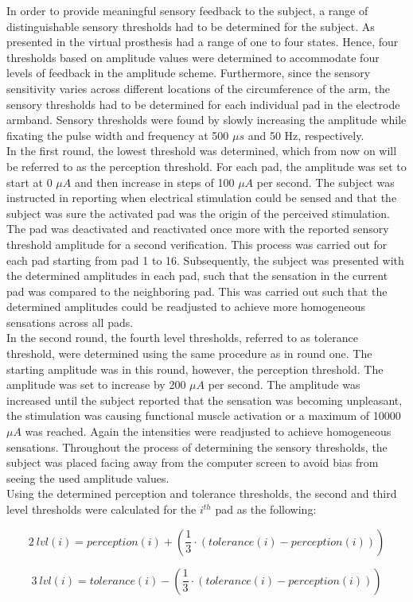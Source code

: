 In order to provide meaningful sensory feedback to the subject, a range of distinguishable sensory thresholds had to be determined for the subject. As presented in  the virtual prosthesis had a range of one to four states. Hence, four thresholds based on amplitude values were determined to accommodate four levels of feedback in the amplitude scheme. Furthermore, since the sensory sensitivity varies across different locations of the circumference of the arm, the sensory thresholds had to be determined for each individual pad in the electrode armband. Sensory thresholds were found by slowly increasing the amplitude while fixating the pulse width and frequency at 500 $\mu s $ and 50 Hz, respectively. \\
In the first round, the lowest threshold was determined, which from now on will be referred to as the perception threshold. For each pad, the amplitude was set to start at 0 $\mu A $ and then increase in steps of 100 $\mu A $ per second. The subject was instructed in reporting when electrical stimulation could be sensed and that the subject was sure the activated pad was the origin of the perceived stimulation. The pad was deactivated and reactivated once more with the reported sensory threshold amplitude for a second verification. This process was carried out for each pad starting from pad 1 to 16. Subsequently, the subject was presented with the determined amplitudes in each pad, such that the sensation in the current pad was compared to the neighboring pad. This was carried out such that the determined amplitudes could be readjusted to achieve more homogeneous sensations across all pads.  \\
In the second round, the fourth level thresholds, referred to as tolerance threshold, were determined using the same procedure as in round one. The starting amplitude was in this round, however, the perception threshold. The amplitude was set to increase by 200 $\mu A $ per second. The amplitude was increased until the subject reported that the sensation was becoming unpleasant, the stimulation was causing functional muscle activation or a maximum of 10000 $\mu A $ was reached. Again the intensities were readjusted to achieve homogeneous sensations. Throughout the process of determining the sensory thresholds, the subject was placed facing away from the computer screen to avoid bias from seeing the used amplitude values.  \\ 
Using the determined perception and tolerance thresholds, the second and third level thresholds were calculated for the $i^{th}$ pad as the following:

\begin{equation}
2~lvl(i) = perception(i) + (\frac{1}{3} \cdot (tolerance(i) - perception(i)))
\end{equation}

\begin{equation}
3~lvl(i) = tolerance(i) - (\frac{1}{3} \cdot (tolerance(i) - perception(i)))
\end{equation}


       